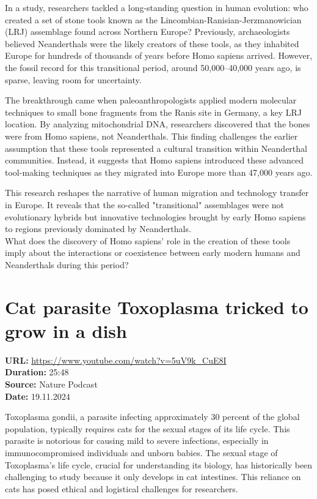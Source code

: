 \documentclass[12pt]{article}
\begin{document}
In a study, researchers tackled a long-standing question in human evolution: who created a set of stone tools known as the Lincombian-Ranisian-Jerzmanowician (LRJ) assemblage found across Northern Europe? Previously, archaeologists believed Neanderthals were the likely creators of these tools, as they inhabited Europe for hundreds of thousands of years before Homo sapiens arrived. However, the fossil record for this transitional period, around 50,000–40,000 years ago, is sparse, leaving room for uncertainty.

The breakthrough came when paleoanthropologists applied modern molecular techniques to small bone fragments from the Ranis site in Germany, a key LRJ location. By analyzing mitochondrial DNA, researchers discovered that the bones were from Homo sapiens, not Neanderthals. This finding challenges the earlier assumption that these tools represented a cultural transition within Neanderthal communities. Instead, it suggests that Homo sapiens introduced these advanced tool-making techniques as they migrated into Europe more than 47,000 years ago.

This research reshapes the narrative of human migration and technology transfer in Europe. It reveals that the so-called "transitional" assemblages were not evolutionary hybrids but innovative technologies brought by early Homo sapiens to regions previously dominated by Neanderthals.\\[5px]
 
What does the discovery of Homo sapiens’ role in the creation of these tools imply about the interactions or coexistence between early modern humans and Neanderthals during this period?




\newpage

\section{Cat parasite Toxoplasma tricked to grow in a dish}
\textbf{URL:} \url{https://www.youtube.com/watch?v=5uV9k_CuE8I}\\
\textbf{Duration:} 25:48\\
\textbf{Source:} Nature Podcast\\
\textbf{Date:} 19.11.2024


Toxoplasma gondii, a parasite infecting approximately 30 percent of the global population, typically requires cats for the sexual stages of its life cycle. This parasite is notorious for causing mild to severe infections, especially in immunocompromised individuals and unborn babies. The sexual stage of Toxoplasma’s life cycle, crucial for understanding its biology, has historically been challenging to study because it only develops in cat intestines. This reliance on cats has posed ethical and logistical challenges for researchers.  
\end{document}
